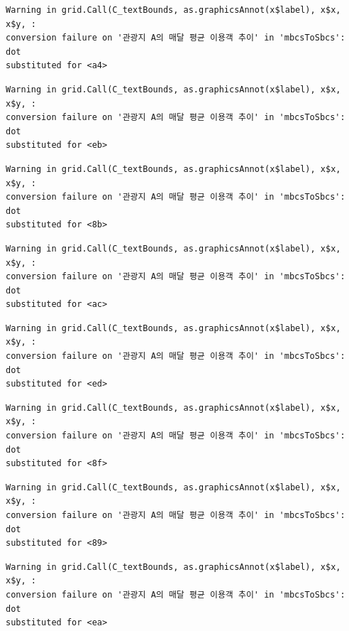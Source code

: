 \documentclass[
  letterpaper,
  DIV=11,
  numbers=noendperiod]{scrreprt}
\begin{document}
\begin{verbatim}
Warning in grid.Call(C_textBounds, as.graphicsAnnot(x$label), x$x, x$y, :
conversion failure on '관광지 A의 매달 평균 이용객 추이' in 'mbcsToSbcs': dot
substituted for <a4>
\end{verbatim}

\begin{verbatim}
Warning in grid.Call(C_textBounds, as.graphicsAnnot(x$label), x$x, x$y, :
conversion failure on '관광지 A의 매달 평균 이용객 추이' in 'mbcsToSbcs': dot
substituted for <eb>
\end{verbatim}

\begin{verbatim}
Warning in grid.Call(C_textBounds, as.graphicsAnnot(x$label), x$x, x$y, :
conversion failure on '관광지 A의 매달 평균 이용객 추이' in 'mbcsToSbcs': dot
substituted for <8b>
\end{verbatim}

\begin{verbatim}
Warning in grid.Call(C_textBounds, as.graphicsAnnot(x$label), x$x, x$y, :
conversion failure on '관광지 A의 매달 평균 이용객 추이' in 'mbcsToSbcs': dot
substituted for <ac>
\end{verbatim}

\begin{verbatim}
Warning in grid.Call(C_textBounds, as.graphicsAnnot(x$label), x$x, x$y, :
conversion failure on '관광지 A의 매달 평균 이용객 추이' in 'mbcsToSbcs': dot
substituted for <ed>
\end{verbatim}

\begin{verbatim}
Warning in grid.Call(C_textBounds, as.graphicsAnnot(x$label), x$x, x$y, :
conversion failure on '관광지 A의 매달 평균 이용객 추이' in 'mbcsToSbcs': dot
substituted for <8f>
\end{verbatim}

\begin{verbatim}
Warning in grid.Call(C_textBounds, as.graphicsAnnot(x$label), x$x, x$y, :
conversion failure on '관광지 A의 매달 평균 이용객 추이' in 'mbcsToSbcs': dot
substituted for <89>
\end{verbatim}

\begin{verbatim}
Warning in grid.Call(C_textBounds, as.graphicsAnnot(x$label), x$x, x$y, :
conversion failure on '관광지 A의 매달 평균 이용객 추이' in 'mbcsToSbcs': dot
substituted for <ea>
\end{verbatim}
\end{document}
